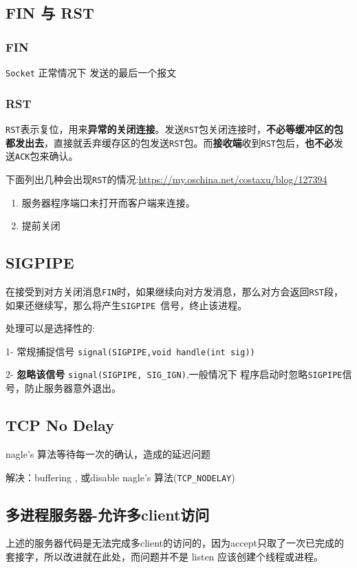 \documentclass[UTF8,a4paper,12pt]{ctexbook}
\begin{document}
		\subsection{FIN 与 RST}
			\subsubsection{FIN}
				\verb|Socket| 正常情况下 发送的最后一个报文
				
			\subsubsection{RST}
				\verb|RST|表示复位，用来\textbf{异常的关闭连接}。发送\verb|RST|包关闭连接时，\textbf{不必等缓冲区的包都发出去}，直接就丢弃缓存区的包发送\verb|RST|包。而\textbf{接收端}收到\verb|RST|包后，\textbf{也不必}发送\verb|ACK|包来确认。
				
				下面列出几种会出现\verb|RST|的情况:\url{https://my.oschina.net/costaxu/blog/127394}
					\begin{enumerate}[itemindent = 1em]
						\item 服务器程序端口未打开而客户端来连接。
						\item 提前关闭
					\end{enumerate}
				
		\subsection{SIGPIPE}
			在接受到对方关闭消息\verb|FIN|时，如果继续向对方发消息，那么对方会返回\verb|RST|段，如果还继续写，那么将产生\verb|SIGPIPE |信号，终止该进程。
			
			处理可以是选择性的:
			
			1- 常规捕捉信号 \verb|signal(SIGPIPE,void handle(int sig))|
			
			2- \textbf{忽略该信号 }\verb|signal(SIGPIPE, SIG_IGN)|,一般情况下 程序启动时忽略\verb|SIGPIPE|信号，防止服务器意外退出。
		
		\subsection{TCP No Delay}
			nagle's 算法等待每一次的确认，造成的延迟问题
			
				解决：buffering , 或disable nagle's 算法(\verb|TCP_NODELAY|)
			
		\subsection{多进程服务器-允许多client访问}
			上述的服务器代码是无法完成多client的访问的，因为accept只取了一次已完成的套接字，所以改进就在此处，而问题并不是 listen 应该创建个线程或进程。
			
\end{document}

